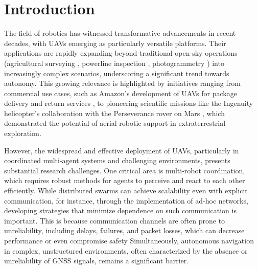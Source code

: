 
\chapter{Introduction\label{chap:introduction}}
The field of robotics has witnessed transformative advancements in recent decades, with \ac{UAVs} emerging as particularly versatile platforms. 
Their applications are rapidly expanding beyond traditional open-sky operations (agricultural surveying \cite{agricultural_survey}, powerline inspection \cite{powerline_inspection}, photogrammetry \cite{photogrammetry}) into increasingly complex scenarios, underscoring a significant trend towards autonomy. 
This growing relevance is highlighted by initiatives ranging from commercial use cases, such as Amazon's development of \ac{UAV}s for package delivery and return services \cite{InsiderIntelligence_DroneDelivery}, to pioneering scientific missions like 
  the Ingenuity helicopter's collaboration with the Perseverance rover on Mars \cite{NASA_Ingenuity}, which demonstrated the potential of aerial robotic support in extraterrestrial exploration.

However, the widespread and effective deployment of \ac{UAV}s, particularly in coordinated multi-agent systems and challenging environments, presents substantial research challenges. 
One critical area is multi-robot coordination, which requires robust methods for agents to perceive and react to each other efficiently. 
While distributed swarms can achieve scalability even with explicit communication, for instance, through the implementation of ad-hoc networks, developing strategies that minimize dependence on such communication is important. 
This is because communication channels are often prone to unreliability, including delays, failures, and packet losses, which can decrease performance or even compromise safety
Simultaneously, autonomous navigation in complex, unstructured environments, often characterized by the absence or unreliability of \ac{GNSS} signals, remains a significant barrier.

